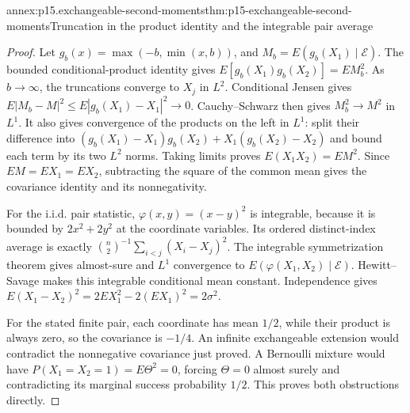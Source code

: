 \begin{annexitem}{annex:p15.exchangeable-second-moments}{thm:p15-exchangeable-second-moments}{Truncation in the product identity and the integrable pair average}
\begin{proof}
Let \(g_b(x)=\max(-b,\min(x,b))\), and
\(M_b=E(g_b(X_1)\mid\mathcal E)\).
The bounded conditional-product identity gives
\(E[g_b(X_1)g_b(X_2)]=EM_b^2\).
As \(b\to\infty\), the truncations converge to \(X_j\) in \(L^2\).
Conditional Jensen gives
\(E|M_b-M|^2\leq E|g_b(X_1)-X_1|^2\to0\).
Cauchy--Schwarz then gives \(M_b^2\to M^2\) in \(L^1\).
It also gives convergence of the products on the left in \(L^1\):
split their difference into
\((g_b(X_1)-X_1)g_b(X_2)+X_1(g_b(X_2)-X_2)\)
and bound each term by its two \(L^2\) norms.
Taking limits proves \(E(X_1X_2)=EM^2\).
Since \(EM=EX_1=EX_2\), subtracting the square of the common mean
gives the covariance identity and its nonnegativity.

For the i.i.d. pair statistic, \(\varphi(x,y)=(x-y)^2\) is integrable,
because it is bounded by \(2x^2+2y^2\) at the coordinate variables.
Its ordered distinct-index average is exactly
\(\binom n2^{-1}\sum_{i<j}(X_i-X_j)^2\).
The integrable symmetrization theorem gives almost-sure and \(L^1\)
convergence to \(E(\varphi(X_1,X_2)\mid\mathcal E)\).
Hewitt--Savage makes this integrable conditional mean constant.
Independence gives
\(E(X_1-X_2)^2=2EX_1^2-2(EX_1)^2=2\sigma^2\).

For the stated finite pair, each coordinate has mean \(1/2\),
while their product is always zero, so the covariance is \(-1/4\).
An infinite exchangeable extension would contradict the nonnegative
covariance just proved. A Bernoulli mixture would have
\(P(X_1=X_2=1)=E\Theta^2=0\), forcing \(\Theta=0\) almost surely
and contradicting its marginal success probability \(1/2\).
This proves both obstructions directly.
\end{proof}
\end{annexitem}

